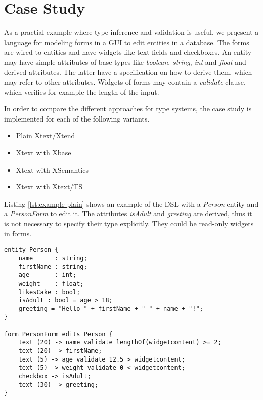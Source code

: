 \section{Case Study}
\label{sec:casestudy}

As a practial example where type inference and validation is useful, we prqesent
a language for modeling forms in a GUI to edit entities in a database. The forms
are wired to entities and have widgets like text fields and checkboxes. An
entity may have simple attributes of base types like \emph{boolean},
\emph{string}, \emph{int} and \emph{float} and derived attributes. The latter
have a specification on how to derive them, which may refer to other attributes.
Widgets of forms may contain a \emph{validate} clause, which verifies for
example the length of the input.

In order to compare the different approaches for type systems, the case study is
implemented for each of the following variants.

\begin{itemize}
\item Plain Xtext/Xtend
\item Xtext with Xbase
\item Xtext with XSemantics
\item Xtext with Xtext/TS
\end{itemize}

Listing \ref{lst:example-plain} shows an example of the DSL with a \emph{Person}
entity and a \emph{PersonForm} to edit it. The attributes \emph{isAdult} and
\emph{greeting} are derived, thus it is not necessary to specify their type
explicitly. They could be read-only widgets in forms.

%

\begin{lstlisting}[language=guidsl,label=lst:example-plain,caption=Forms
and Entities DSL.] 
entity Person {
	name      : string;
	firstName : string;
	age       : int; 
	weight    : float;
	likesCake : bool; 
	isAdult : bool = age > 18;
	greeting = "Hello " + firstName + " " + name + "!";
}

form PersonForm edits Person {
	text (20) -> name validate lengthOf(widgetcontent) >= 2;
	text (20) -> firstName;
	text (5) -> age validate 12.5 > widgetcontent;
	text (5) -> weight validate 0 < widgetcontent;
	checkbox -> isAdult;
	text (30) -> greeting;
}
\end{lstlisting}


